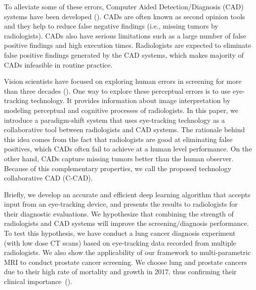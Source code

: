 \documentclass[preprint,12pt]{elsarticle}
\begin{document}
To alleviate some of these errors, Computer Aided Detection/Diagnosis (CAD) systems have been developed (\cite{firmino2014computer,lemaitre2015computer,jalalian2013computer}). CADs are often known as second opinion tools and they help to reduce false negative findings (i.e., missing tumors by radiologists). CADs also have serious limitations such as a large number of false positive findings and high execution times. Radiologists are expected to eliminate false positive findings generated by the CAD systems, which makes majority of CADs infeasible in routine practice.

%
%
%

Vision scientists have focused on exploring human errors in screening for more than three decades (\cite{kundel1978visual,lee2013cognitive,mccreadie2009eight,al2017eye,kok2017before,venjakob2015visual,drew2013informatics,manning2006radiologists,littlefair2017does,tourassi2013investigating}). One way to explore these perceptual errors is to use eye-tracking technology. It provides information about image interpretation by modeling perceptual and cognitive processes of radiologists. In this paper, we introduce a paradigm-shift system that uses eye-tracking technology as a collaborative tool between radiologists and CAD systems. The rationale behind this idea comes from the fact that radiologists are good at eliminating false positives, which CADs often fail to achieve at a human level performance. On the other hand, CADs capture missing tumors better than the human observer. Because of this complementary properties, we call the proposed technology collaborative CAD (C-CAD).

Briefly, we develop an accurate and efficient deep learning algorithm that accepts input from an eye-tracking device, and presents the results to radiologists for their diagnostic evaluations. We hypothesize that combining the strength of radiologists and CAD systems will improve the screening/diagnosis performance. To test this hypothesis, we have conduct a lung cancer diagnosis experiment (with low dose CT scans) based on eye-tracking data recorded from multiple radiologists. We also show the applicability of our framework to multi-parametric MRI to conduct prostate cancer screening. We choose lung and prostate cancers due to their high rate of mortality and growth in 2017, thus confirming their clinical importance~(\cite{CAAC:CAAC21387}).
\end{document}

